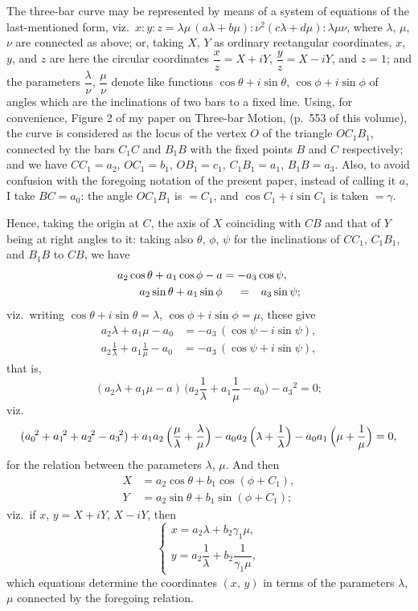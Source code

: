 \documentclass[12pt,a4paper]{article}
\begin{document}
\newpage

\noindent
The three-bar curve may be represented by means of a system of equations of the last-mentioned form, viz.\ $x:y:z = \lambda\mu\,(a\lambda+b\mu) : \nu^2(c\lambda+d\mu) : \lambda\mu\nu$, where $\lambda$, $\mu$, $\nu$ are connected as above; or, taking $X$, $Y$ as ordinary rectangular coordinates, $x$, $y$, and $z$ are here the circular coordinates $\dfrac{x}{z} = X+iY$, $\dfrac{y}{z} = X-iY$, and $z=1$; and the parameters $\dfrac{\lambda}{\nu}$, $\dfrac{\mu}{\nu}$ denote like functions $\cos\theta+i\sin\theta$, $\cos\phi+i\sin\phi$ of angles which are the inclinations of two bars to a fixed line. Using, for convenience, Figure 2 of my paper on Three-bar Motion, (p.~553 of this volume), the curve is considered as the locus of the vertex $O$ of the triangle $OC_1B_1$, connected by the bars $C_1C$ and $B_1B$ with the fixed points $B$ and $C$ respectively; and we have $CC_1=a_2$, $OC_1=b_1$, $OB_1=c_1$, $C_1B_1=a_1$, $B_1B=a_3$. Also, to avoid confusion with the foregoing notation of the present paper, instead of calling it $a$, I take $BC=a_0$: the angle $OC_1B_1$ is $=C_1$, and $\cos C_1+i\sin C_1$ is taken $=\gamma$.

Hence, taking the origin at $C$, the axis of $X$ coinciding with $CB$ and that of $Y$ being at right angles to it: taking also $\theta$, $\phi$, $\psi$ for the inclinations of $CC_1$, $C_1B_1$, and $B_1B$ to $CB$, we have
\begin{alignat*}{2}
a_2\cos\theta + a_1\cos\phi - a &= -a_3\cos\psi, \\
a_2\sin\theta + a_1\sin\phi &\hphantom{{}={}} = \hphantom{-}a_3\sin\psi;
\end{alignat*}
viz.\ writing $\cos\theta+i\sin\theta=\lambda$, $\cos\phi+i\sin\phi=\mu$, these give
\begin{align*}
a_2\lambda + a_1\mu - a_0 &= -a_3\,(\cos\psi - i\sin\psi), \\
a_2\frac{1}{\lambda} + a_1\frac{1}{\mu} - a_0 &= -a_3\,(\cos\psi + i\sin\psi),
\end{align*}
that is,
\[
(a_2\lambda + a_1\mu - a)\,\bigl(a_2\frac{1}{\lambda} + a_1\frac{1}{\mu} - a_0\bigr) - a_3{}^{\!2} = 0;
\]
viz.
\[
(a_0{}^{\!2} + a_1{}^{\!2} + a_2{}^{\!2} - a_3{}^{\!2}) + a_1a_2\,\Bigl(\frac{\mu}{\lambda}+\frac{\lambda}{\mu}\Bigr) - a_0a_2\,\Bigl(\lambda+\frac{1}{\lambda}\Bigr) - a_0a_1\,\Bigl(\mu+\frac{1}{\mu}\Bigr) = 0,
\]
for the relation between the parameters $\lambda$, $\mu$. And then
\begin{align*}
X &= a_2\cos\theta + b_1\cos(\phi+C_1), \\
Y &= a_2\sin\theta + b_1\sin(\phi+C_1);
\end{align*}
viz.\ if $x$, $y = X+iY$, $X-iY$, then
\[
\begin{cases}
x = a_2\lambda + b_2\gamma_1\mu, \\[4pt]
y = a_2\dfrac{1}{\lambda} + b_2\dfrac{1}{\gamma_1\mu},
\end{cases}
\]
which equations determine the coordinates $(x,\,y)$ in terms of the parameters $\lambda$, $\mu$ connected by the foregoing relation.
\end{document}
